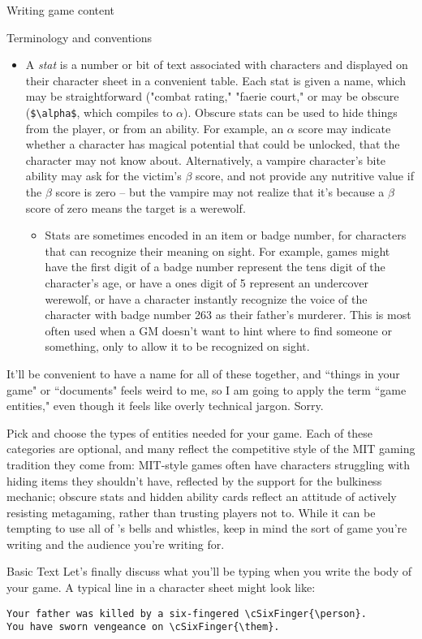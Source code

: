 \documentclass{article}
\begin{document}
\begin{section}{Writing game content}
\begin{subsection}{Terminology and conventions}
\begin{itemize}
\begin{itemize}
\end{itemize}
  \item A \textit{stat} is a number or bit of text associated with characters and displayed on their character sheet in a convenient table.  Each stat is given a name, which may be straightforward ("combat rating," "faerie court," or may be obscure (\lstinline{$\alpha$}, which compiles to $\alpha$).  Obscure stats can be used to hide things from the player, or from an ability.  For example, an $\alpha$ score may indicate whether a character has magical potential that could be unlocked, that the character may not know about.  Alternatively, a vampire character's bite ability may ask for the victim's $\beta$ score, and not provide any nutritive value if the $\beta$ score is zero – but the vampire may not realize that it's because a $\beta$ score of zero means the target is a werewolf.
\begin{itemize}
\item Stats are sometimes encoded in an item or badge number, for characters that can recognize their meaning on sight.  For example, games might have the first digit of a badge number represent the tens digit of the character's age, or have a ones digit of 5 represent an undercover werewolf, or have a character instantly recognize the voice of the character with badge number 263 as their father's murderer.  This is most often used when a GM doesn't want to hint where to find someone or something, only to allow it to be recognized on sight.
\end{itemize}
\end{itemize}

It'll be convenient to have a name for all of these together, and ``things in your game" or ``documents" feels weird to me, so I am going to apply the term ``game entities," even though it feels like overly technical jargon.  Sorry.

Pick and choose the types of entities needed for your game.  Each of these categories are optional, and many reflect the competitive style of the MIT gaming tradition they come from: MIT-style games often have characters struggling with hiding items they shouldn't have, reflected by the support for the bulkiness mechanic; obscure stats and hidden ability cards reflect an attitude of actively resisting metagaming, rather than trusting players not to.  While it can be tempting to use all of \gametex{}'s bells and whistles, keep in mind the sort of game you're writing and the audience you're writing for.
\end{subsection}
\begin{subsection}{Basic \gametex{} Text}
Let's finally discuss what you'll be typing when you write the body of your game.
A typical line in a \gametex{} character sheet might look like:
\begin{verbatim}
Your father was killed by a six-fingered \cSixFinger{\person}.  
You have sworn vengeance on \cSixFinger{\them}.
\end{verbatim}


\end{subsection}
\end{section}
\end{document}
